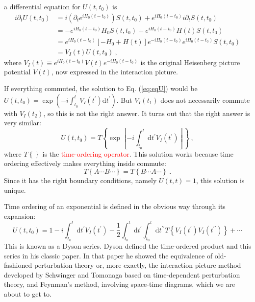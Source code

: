\documentclass[11pt,a4paper]{article}
\newcommand{\dif}{\mathrm{d}}
\newcounter{theo}[section]\setcounter{theo}{0}
\begin{document}
a differential equation for $U(t, t_0)$ is  
\begin{align}
\nonumber i \partial_t U(t, t_0) &= i\left(\partial_t e^{iH_0(t-t_0)} \right) S(t, t_0) + e^{iH_0(t-t_0)} i \partial_t S(t, t_0) \\
\nonumber &= -e^{iH_0(t-t_0)} H_0 S(t, t_0) +e^{iH_0(t-t_0)} H(t) S(t, t_0) \\
\nonumber &= e^{iH_0(t-t_0)} [-H_0 +H(t)] e^{-iH_0(t-t_0)} e^{iH_0(t-t_0)} S(t, t_0) \\
&= V_I(t) U(t, t_0) ~,
\label{eq:eqU}
\end{align}
where $V_I(t) \equiv e^{iH_0 (t-t_0)} V(t) e^{-iH_0(t-t_0)}$ is the original Heisenberg picture potential $V(t)$, now expressed in the interaction picture.

If everything commuted, the solution to Eq. (\ref{eq:eqU}) would be $U(t, t_0) = \exp \left(-i \int_{t_0}^t V_I(t^\prime) \dif t^\prime \right)$. But $V_I(t_1)$ does not necessarily commute with $V_I(t_2)$, so this is not the right answer. It turns out that the right answer is very similar:
\begin{equation}
U(t, t_0) = T \left\{ \exp \left[-i \int_{t_0}^t \dif t^\prime V_I(t^\prime) \right] \right\}  ~,
\end{equation}
where $T\left\{ \right\}$ is the \textcolor{red}{time-ordering operator}. This solution works because time ordering effectively makes everything inside commute:
\begin{equation}
T\left\{A \cdots B \cdots \right\} = T\left\{B \cdots A \cdots \right\} ~.
\end{equation}
Since it has the right boundary conditions, namely $U(t, t) = 1$, this solution is unique.

Time ordering of an exponential is defined in the obvious way through its expansion:
\begin{equation}
U(t, t_0) = 1 -i \int_{t_0}^t \dif t^\prime V_I(t^\prime) -\dfrac{1}{2} \int_{t_0}^t \dif t^\prime \int_{t_0}^t \dif t^{\prime \prime} T\left\{V_I(t^\prime) V_I( t^{\prime \prime}) \right\}  +\cdots
\end{equation}
This is known as a Dyson series. Dyson defined the time-ordered product and this series in his classic paper. In that paper he showed the equivalence of old-fashioned perturbation theory or, more exactly, the interaction picture method developed by Schwinger and Tomonaga based on time-dependent perturbation theory, and Feynman's method, involving space-time diagrams, which we are about to get to.
\end{document}

